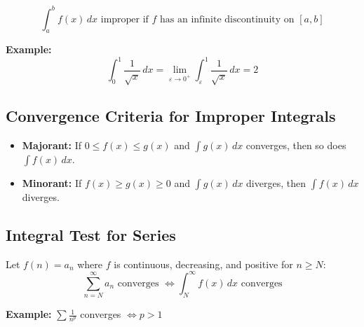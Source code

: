 \[
\int_a^b f(x)\,dx \text{ improper if } f \text{ has an infinite discontinuity on } [a, b]
\]

\textbf{Example:}
\[
\int_0^1 \frac{1}{\sqrt{x}}\,dx = \lim_{\varepsilon \to 0^+} \int_\varepsilon^1 \frac{1}{\sqrt{x}}\,dx = 2
\]

\subsection{Convergence Criteria for Improper Integrals}

\begin{itemize}[label=\(-\)]
\item \textbf{Majorant:} If \(0 \le f(x) \le g(x)\) and \(\int g(x)\,dx\) converges, then so does \(\int f(x)\,dx\).
\item \textbf{Minorant:} If \(f(x) \ge g(x) \ge 0\) and \(\int g(x)\,dx\) diverges, then \(\int f(x)\,dx\) diverges.
\end{itemize}

\subsection{Integral Test for Series}

Let \(f(n) = a_n\) where \(f\) is continuous, decreasing, and positive for \(n \ge N\):
\[
\sum_{n=N}^\infty a_n \text{ converges } \iff \int_N^\infty f(x)\,dx \text{ converges}
\]

\textbf{Example:} \(\sum \frac{1}{n^p}\) converges \(\iff p > 1\)

\newpage                                                